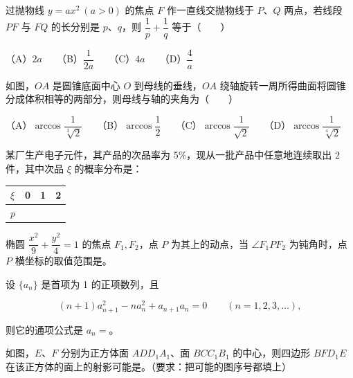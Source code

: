 \begin{question}
过抛物线 $y=ax^2\ (a>0)$ 的焦点 $F$ 作一直线交抛物线于 $P$、$Q$ 两点，若线段 $PF$ 与 $FQ$ 的长分别是 $p$、$q$，则 $\dfrac1p+\dfrac1q$ 等于\mbox{（　　）}

（A）$2a$　　（B）$\dfrac1{2a}$　　（C）$4a$　　（D）$\dfrac4a$

\Needspace{0.4\textheight}
\end{question}
\begin{question}
如图，$OA$ 是圆锥底面中心 $O$ 到母线的垂线，$OA$ 绕轴旋转一周所得曲面将圆锥分成体积相等的两部分，则母线与轴的夹角为\mbox{（　　）}
\nopagebreak[4]
\begin{center}\end{center}
\nopagebreak[4]
（A）$\arccos\dfrac1{\sqrt[3]{2}}$　　（B）$\arccos\dfrac12$　　（C）$\arccos\dfrac1{\sqrt2}$　　（D）$\arccos\dfrac1{\sqrt[4]{2}}$

\end{question}

\begin{question}
某厂生产电子元件，其产品的次品率为 5\%，现从一批产品中任意地连续取出 2 件，其中次品 $\xi$ 的概率分布是：

\begin{center}
\begin{tabular}{lrrr}
\toprule
$\xi$ & 0 & 1 & 2 \\
\midrule
$p$ & \gkblank{} & \gkblank{} & \gkblank{} \\
\bottomrule
\end{tabular}
\end{center}

\end{question}
\begin{question}
椭圆 $\dfrac{x^2}{9}+\dfrac{y^2}{4}=1$ 的焦点 $F_1,F_2$，点 $P$ 为其上的动点，当 $\angle F_1PF_2$ 为钝角时，点 $P$ 横坐标的取值范围是\gkblank{}。

\end{question}
\begin{question}
设 $\{a_n\}$ 是首项为 1 的正项数列，且

\nopagebreak[4]
\[
(n+1)a_{n+1}^2-na_n^2+a_{n+1}a_n=0
\qquad(n=1,2,3,\ldots),
\]

则它的通项公式是 $a_n=$\gkblank{}。

\Needspace{0.4\textheight}
\end{question}
\begin{question}
如图，$E$、$F$ 分别为正方体面 $ADD_1A_1$、面 $BCC_1B_1$ 的中心，则四边形 $BFD_1E$ 在该正方体的面上的射影可能是\gkblank{}。（要求：把可能的图序号都填上）
\nopagebreak[4]
\begin{center}\end{center}
\nopagebreak[4]
\end{question}

